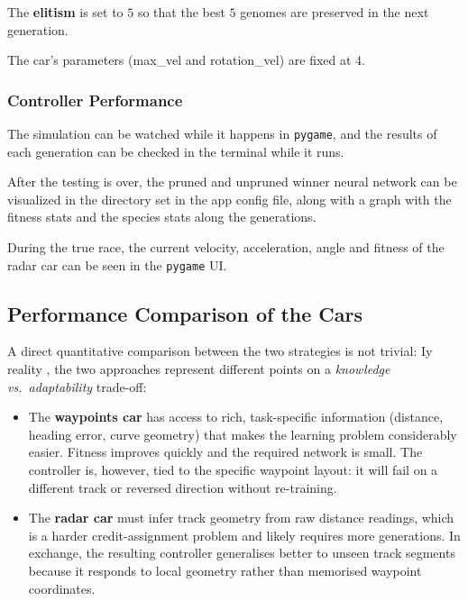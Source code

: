 \documentclass[a4paper]{article}
\begin{document}
The \textbf{elitism} is set to $5$ so that the best $5$ genomes are preserved in the next generation.

The car's parameters (max\_vel and rotation\_vel) are fixed at $4$.

\subsubsection{Controller Performance}
\label{subsubsec:radars-controller-performance}

The simulation can be watched while it happens in \texttt{pygame}, and the results of each generation can be checked in the terminal while it runs.

After the testing is over, the pruned and unpruned winner neural network can be visualized in the directory set in the app config file, along with a graph with the fitness stats and the species stats along the generations.

During the true race, the current velocity, acceleration, angle and fitness of the radar car can be seen in the \texttt{pygame} UI.



\subsection{Performance Comparison of the Cars}
\label{subsec:performance-comparison}

A direct quantitative comparison between the two strategies is not trivial:
Iy reality , the two approaches represent different points on a
\emph{knowledge vs.\ adaptability} trade-off:

\begin{itemize}
    \item The \textbf{waypoints car} has access to rich, task-specific information
    (distance, heading error, curve geometry) that makes the learning problem
    considerably easier.
    Fitness improves quickly and the required network is small.
    The controller is, however, tied to the specific waypoint layout: it will fail
    on a different track or reversed direction without re-training.
    \item The \textbf{radar car} must infer track geometry from raw distance readings,
    which is a harder credit-assignment problem and likely requires more generations.
    In exchange, the resulting controller generalises better to unseen track segments
    because it responds to local geometry rather than memorised waypoint coordinates.
\end{itemize}
\end{document}

